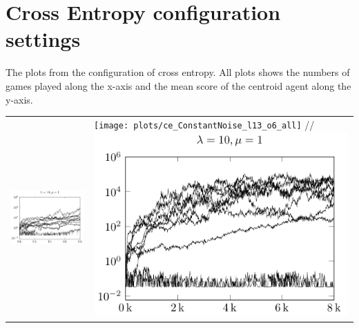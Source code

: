 \section{Cross Entropy configuration settings \label{appendixCrossEntropyConfig}}

The plots from the configuration of cross entropy.
All plots shows the numbers of games played along the x-axis
and the mean score of the centroid agent along the y-axis.

\begin{tabular}{@{}l@{}l@{}}
\includegraphics[scale=1]{plots/ce_ConstantNoise_l10_o1_all} &
\texttt{[image: plots/ce\_ConstantNoise\_l13\_o6\_all]} //
\includegraphics[scale=1]{plots/ce_ConstantNoise_l10_o5_all} &
\end{tabular}

